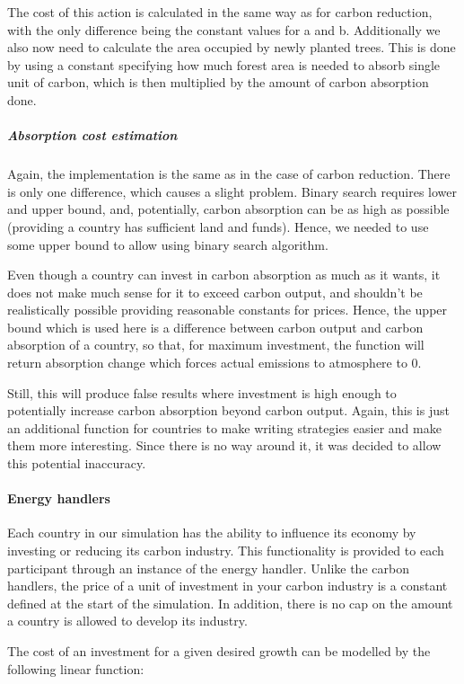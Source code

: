 \documentclass[]{article} %
\begin{document}
The cost of this action is calculated in the same way as for carbon reduction, with the only difference being the constant values for a and b. Additionally we also now need to calculate the area occupied by newly planted trees. This is done by using a constant specifying how much forest area is needed to absorb single unit of carbon, which is then multiplied by the amount of carbon absorption done.

\subparagraph{Absorption cost estimation}

Again, the implementation is the same as in the case of carbon reduction. There is only one difference, which causes a slight problem. Binary search requires lower and upper bound, and, potentially, carbon absorption can be as high as possible (providing a country has sufficient land and funds). Hence, we needed to use some upper bound to allow using binary search algorithm.

Even though a country can invest in carbon absorption as much as it wants, it does not make much sense for it to exceed carbon output, and shouldn’t be realistically possible providing reasonable constants for prices. Hence, the upper bound which is used here is a difference between carbon output and carbon absorption of a country, so that, for maximum investment, the function will return absorption change which forces actual emissions to atmosphere to 0.

Still, this will produce false results where investment is high enough to potentially increase carbon absorption beyond carbon output. Again, this is just an additional function for countries to make writing strategies easier and make them more interesting. Since there is no way around it, it was decided to allow this potential inaccuracy.

\paragraph{Energy handlers}

Each country in our simulation has the ability to influence its economy by investing or reducing its carbon industry. This functionality is provided to each participant through an instance of the energy handler. Unlike the carbon handlers, the price of a unit of investment in your carbon industry is a constant defined at the start of the simulation. In addition, there is no cap on the amount a country is allowed to develop its industry. 

The cost of an investment for a given desired growth can be modelled by the following linear function:
\end{document}

